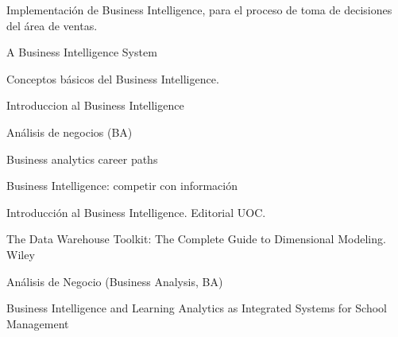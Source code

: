\documentclass[twoside,twocolumn]{article}
\begin{document}
\begin{thebibliography}{99} 

\newblock Implementación de Business Intelligence, para el proceso de toma de decisiones del área de ventas.

\newblock A Business Intelligence System

Conceptos básicos del Business Intelligence.

\newblock Introduccion al Business Intelligence

\newblock Análisis de negocios (BA)

\newblock Business analytics career paths

\newblock Business Intelligence: competir con información


\bibitem[Curto J., 2010]{} 
\newblock Introducción al Business Intelligence. Editorial UOC.

\newblock  The Data Warehouse Toolkit: The Complete Guide to Dimensional Modeling. Wiley

\bibitem[Carolina A., 2017]{} 
\newblock  Análisis de Negocio (Business Analysis, BA)

\newblock  Business Intelligence and Learning Analytics as Integrated Systems for School Management
 
\end{thebibliography}


\end{document}
